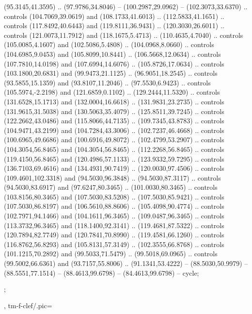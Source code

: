 {{\begin{scope}[scale=0.295,transform shape,y=0.80pt,x=0.80pt,xshift=-55pt,yshift=-1.3465pt-4mm/0.295]
        (95.3145,41.3595) .. (97.9786,34.8046) -- (100.2987,29.0962) --
        (102.3073,33.6370) .. controls (104.7069,39.0619) and (108.1733,41.6013) ..
        (112.5833,41.1651) .. controls (117.8492,40.6443) and (119.8111,36.9431) ..
        (120.3030,26.6011) .. controls (121.0073,11.7912) and (118.1675,5.4713) ..
        (110.4635,4.7040) .. controls (105.0085,4.1607) and (102.5086,5.4808) ..
        (104.0968,8.0660) .. controls (104.6985,9.0453) and (105.8099,10.8441) ..
        (106.5668,12.0634) .. controls (107.7810,14.0198) and (107.6994,14.6076) ..
        (105.8726,17.0634) .. controls (103.1800,20.6831) and (99.9473,21.1125) ..
        (96.9051,18.2545) .. controls (93.5855,15.1359) and (93.8107,11.2046) ..
        (97.5530,6.9423) .. controls (105.5974,-2.2198) and (121.6859,0.1102) ..
        (129.2444,11.5320) .. controls (131.6528,15.1713) and (132.0004,16.6618) ..
        (131.9831,23.2735) .. controls (131.9615,31.5038) and (130.5063,35.4079) ..
        (125.8511,39.7245) .. controls (122.2662,43.0486) and (115.8066,44.7135) ..
        (109.7345,43.8783) .. controls (104.9471,43.2199) and (104.7284,43.3006) ..
        (102.7237,46.4668) .. controls (100.6965,49.6686) and (100.6916,49.8072) ..
        (102.4799,53.2907) .. controls (104.3054,56.8465) and (104.3054,56.8465) ..
        (112.2268,56.8465) .. controls (119.4150,56.8465) and (120.4986,57.1133) ..
        (123.9332,59.7295) .. controls (136.7103,69.4616) and (134.4931,90.7419) ..
        (120.0030,97.4506) .. controls (109.4601,102.3318) and (94.5030,96.3848) ..
        (94.5030,87.3117) .. controls (94.5030,83.6917) and (97.6247,80.3465) ..
        (101.0030,80.3465) .. controls (103.8156,80.3465) and (107.5030,83.5208) ..
        (107.5030,85.9421) .. controls (107.5030,86.8197) and (106.5610,88.8606) ..
        (105.4098,90.4774) .. controls (102.7971,94.1466) and (104.1611,96.3465) ..
        (109.0487,96.3465) .. controls (113.3732,96.3465) and (118.1400,92.3141) ..
        (119.4681,87.5322) .. controls (120.7894,82.7749) and (120.7841,70.8990) ..
        (119.4581,66.1260) .. controls (116.8762,56.8293) and (105.8131,57.3149) ..
        (102.3555,66.8768) .. controls (101.1215,70.2892) and (99.5033,71.5479) ..
        (99.5018,69.0965) .. controls (99.5002,66.6361) and (93.7157,55.8006) ..
        (91.1341,53.4222) -- (88.5030,50.9979) -- (88.5551,77.1514) --
        (88.4613,99.6798) -- (84.4613,99.6798) -- cycle;
    \end{scope}
    ; %
  },
  tm-f-clef/.pic={
    \begin{scope}[y=-0.80pt,x=0.80pt,xshift=-14pt,yshift=22.5pt,scale=0.28,transform shape]

\end{scope}}}
